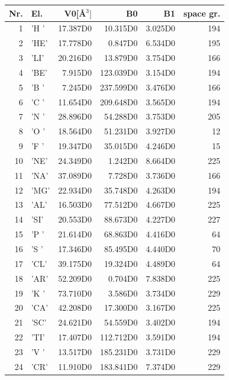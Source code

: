 \documentclass[11pt,a4paper]{report}
\begin{document}
\begin{table}[ht]
\begin{center}
\begin{tabular}{|r|l|r|r|r|r|}
\hline
Nr. & El. & V0[\AA$^3]$ & B0 & B1 & space gr.\\
\hline
  1 & 'H '&    17.387D0&    10.315D0&     3.025D0&194 \\
  2 & 'HE'&    17.778D0&     0.847D0&     6.534D0&195 \\
  3 & 'LI'&    20.216D0&    13.879D0&     3.754D0&166 \\
  4 & 'BE'&     7.915D0&   123.039D0&     3.154D0&194 \\
  5 & 'B '&     7.245D0&   237.599D0&     3.476D0&166 \\
  6 & 'C '&    11.654D0&   209.648D0&     3.565D0&194 \\
  7 & 'N '&    28.896D0&    54.288D0&     3.753D0&205 \\
  8 & 'O '&    18.564D0&    51.231D0&     3.927D0& 12 \\
  9 & 'F '&    19.347D0&    35.015D0&     4.246D0& 15 \\
 10 & 'NE'&    24.349D0&     1.242D0&     8.664D0&225 \\
 11 & 'NA'&    37.089D0&     7.728D0&     3.736D0&166 \\
 12 & 'MG'&    22.934D0&    35.748D0&     4.263D0&194 \\
 13 & 'AL'&    16.503D0&    77.512D0&     4.667D0&225 \\
 14 & 'SI'&    20.553D0&    88.673D0&     4.227D0&227 \\
 15 & 'P '&    21.614D0&    68.863D0&     4.416D0& 64 \\
 16 & 'S '&    17.346D0&    85.495D0&     4.440D0& 70 \\
 17 & 'CL'&    39.175D0&    19.324D0&     4.489D0& 64 \\
 18 & 'AR'&    52.209D0&     0.704D0&     7.838D0&225 \\
 19 & 'K '&    73.710D0&     3.586D0&     3.734D0&229 \\
 20 & 'CA'&    42.208D0&    17.300D0&     3.167D0&225 \\
 21 & 'SC'&    24.621D0&    54.559D0&     3.402D0&194 \\
 22 & 'TI'&    17.407D0&   112.712D0&     3.591D0&194 \\
 23 & 'V '&    13.517D0&   185.231D0&     3.731D0&229 \\
 24 & 'CR'&    11.910D0&   183.841D0&     7.374D0&229 \\

\end{tabular}
\end{center}
\end{table}
\end{document}
